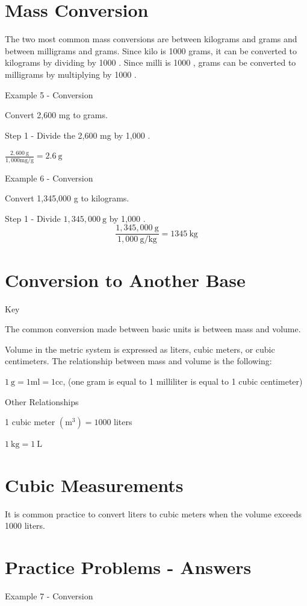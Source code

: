 \documentclass[10pt]{article}
\begin{document}
\section{Mass Conversion}
The two most common mass conversions are between kilograms and grams and between milligrams and grams. Since kilo is 1000 grams, it can be converted to kilograms by dividing by 1000 . Since milli is 1000 , grams can be converted to milligrams by multiplying by 1000 .

Example 5 - Conversion

Convert 2,600 mg to grams.

Step 1 - Divide the 2,600 mg by 1,000 .

$\frac{2,600 \mathrm{~g}}{1,000 \mathrm{mg} / \mathrm{g}}=2.6 \mathrm{~g}$

Example 6 - Conversion

Convert 1,345,000 g to kilograms.

Step 1 - Divide $1,345,000 \mathrm{~g}$ by 1,000 .
$$
\frac{1,345,000 \mathrm{~g}}{1,000 \mathrm{~g} / \mathrm{kg}}=1345 \mathrm{~kg}
$$

\section{Conversion to Another Base}
Key

The common conversion made between basic units is between mass and volume.

Volume in the metric system is expressed as liters, cubic meters, or cubic centimeters. The relationship between mass and volume is the following:

$1 \mathrm{~g}=1 \mathrm{ml}=1 \mathrm{cc}$, (one gram is equal to 1 milliliter is equal to 1 cubic centimeter)

Other Relationships

1 cubic meter $\left(\mathrm{m}^{3}\right)=1000$ liters

$1 \mathrm{~kg}=1 \mathrm{~L}$

\section{Cubic Measurements}
It is common practice to convert liters to cubic meters when the volume exceeds 1000 liters.

\section{Practice Problems - Answers}
Example 7 - Conversion
\end{document}
